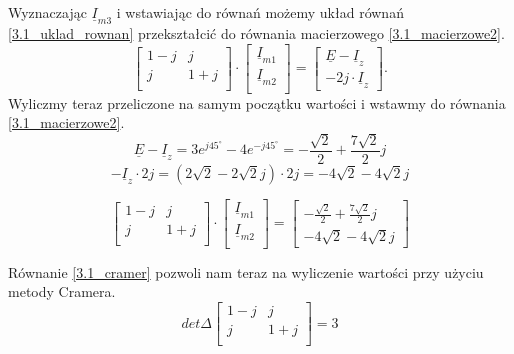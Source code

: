 \documentclass[12pt, a4paper]{article}
\begin{document}
Wyznaczając $\underline{I}_{m3}$ i wstawiając do równań możemy układ równań
\ref{3.1_uklad_rownan} przekształcić do równania macierzowego \ref{3.1_macierzowe2}.
\begin{equation}\label{3.1_macierzowe2}
  \begin{bmatrix}
    1-j & j   \\
    j   & 1+j \\
  \end{bmatrix}
  \cdot
  \begin{bmatrix}
    \underline{I}_{m1} \\
    \underline{I}_{m2} \\
  \end{bmatrix}
  =
  \begin{bmatrix}
    \underline{E} - \underline{I}_z \\
    -2j \cdot \underline{I}_z
  \end{bmatrix}.
\end{equation}
Wyliczmy teraz przeliczone na samym początku wartości i wstawmy do równania
\ref{3.1_macierzowe2}.
\begin{equation*}
  \underline{E} - \underline{I}_z = 3e^{j45^\circ} - 4e^{-j45^\circ} =
  -\frac{\sqrt{2}}{2}+\frac{7\sqrt{2}}{2}j
\end{equation*}
\begin{equation*}
  - \underline{I}_z \cdot 2j = (2\sqrt{2}-2\sqrt{2}j)\cdot 2j =
  -4\sqrt{2}-4\sqrt{2}j
\end{equation*}

\begin{equation}\label{3.1_cramer}
  \begin{bmatrix}
    1-j & j   \\
    j   & 1+j \\
  \end{bmatrix}
  \cdot
  \begin{bmatrix}
    \underline{I}_{m1} \\
    \underline{I}_{m2} \\
  \end{bmatrix}
  =
  \begin{bmatrix}
    -\frac{\sqrt{2}}{2}+\frac{7\sqrt{2}}{2}j \\
    -4\sqrt{2}-4\sqrt{2}j
  \end{bmatrix}
\end{equation}

Równanie \ref{3.1_cramer} pozwoli nam teraz na wyliczenie wartości przy użyciu metody Cramera.
\begin{equation*}
  det\Delta
  \begin{bmatrix}
    1-j & j   \\
    j   & 1+j \\
  \end{bmatrix}
  = 3
\end{equation*}
\end{document}
